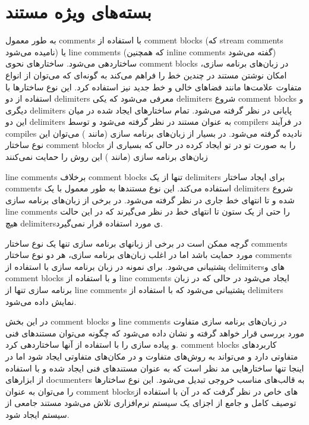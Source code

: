 \section{بسته‌های ویژه مستند}

به طور معمول \glspl{comment} با استفاده از \glspl{comment block} (که
\glspl{stream comment} نامیده می‌شود) یا \glspl{line comment} (که همچنین
\glspl{inline comment} گفته می‌شود) ساختاردهی می‌شود\cite{wiki6}. ساختارهای نحوی
\glspl{comment block} در زبان‌های برنامه سازی، امکان نوشتن
مستند در چندین خط را فراهم می‌کند به گونه‌ای که می‌توان از انواع متفاوت علامت‌ها
مانند فضاهای خالی و خط جدید نیز استفاده کرد. این نوع ساختارها با استفاده از دو
\glspl{delimiter} معرفی می‌شود که یکی \glspl{delimiter} شروع \glspl{comment
block} و دیگری \glspl{delimiter} پایانی در نظر گرفته می‌شود. تمام ساختارهای
ایجاد شده در میان این دو \glspl{delimiter} به عنوان مستند در نظر گرفته می‌شود و
توسط \glspl{compiler} در فرآیند \glspl{compile} نادیده گرفته می‌شود. در بسیار از
زبان‌های برنامه سازی (مانند ) می‌توان این نوع ساختار \glspl{comment
block} را به صورت تو در تو ایجاد کرده در حالی که بسیاری از زبان‌های برنامه سازی
(مانند ) این روش را حمایت نمی‌کنند\cite{wiki[7][8][9]}

\glspl{line comment} برخلاف \glspl{comment block} تنها از یک \glspl{delimiter}
برای ایجاد ساختار \glspl{comment} استفاده می‌کند. این نوع مستندها به طور معمول
با یک \glspl{delimiter} شروع شده و تا انتهای خط جاری در نظر گرفته می‌شود. در
برخی از زبان‌های برنامه سازی \glspl{line comment} را حتی از یک ستون تا انتهای خط
در نظر می‌گیرند که در این حالت هیچ \glspl{delimiter}ی مورد استفاده قرار
نمی‌گیرد\cite{wiki9}.

گرچه ممکن است در برخی از زبانهای برنامه سازی تنها یک نوع ساختار \glspl{comment}
مورد حمایت باشد اما در اغلب زبان‌های برنامه سازی، هر دو نوع ساختار
\glspl{comment} پشتیبانی می‌شود. برای نمونه در زبان برنامه سازی  با
استفاده از \glspl{delimiter}های \lr{/*} و \lr{*/} \glspl{comment block} و با
استفاده از \lr{//} \glspl{line comment} ایجاد می‌شود در حالی که در زبان برنامه
سازی  تنها از \glspl{line comment} پشتیبانی می‌شود که با استفاده از
\glspl{delimiter} \lr{--} نمایش داده می‌شود\cite{wiki9}.

در این بخش \glspl{comment block} و \glspl{line comment} در زبان‌های برنامه سازی
متفاوت مورد بررسی قرار خواهد گرفته و نشان داده می‌شود که چگونه می‌توان مستند‌های
فنی و پیاده سازی را با استفاده از آنها ساختاردهی کرد.
\glspl{comment block} کاربردهای متفاوتی دارد و می‌تواند به روش‌های متفاوت و در
مکان‌های متفاوتی ایجاد شود اما در اینجا تنها ساختارهایی مد نظر است که به عنوان
مستندهای فنی ایجاد شده و با استفاده از ابزارهای \glspl{documenter} به قالب‌های
مناسب خروجی تبدیل می‌شود. این نوع ساختارها را می‌توان به عنوان \glspl{comment
block}های خاص در نظر گرفت که در آن با استفاده از توصیف کامل و جامع از اجزای یک
سیستم نرم‌افزاری تلاش می‌شود مستند جامعی از سیستم ایجاد شود. 

